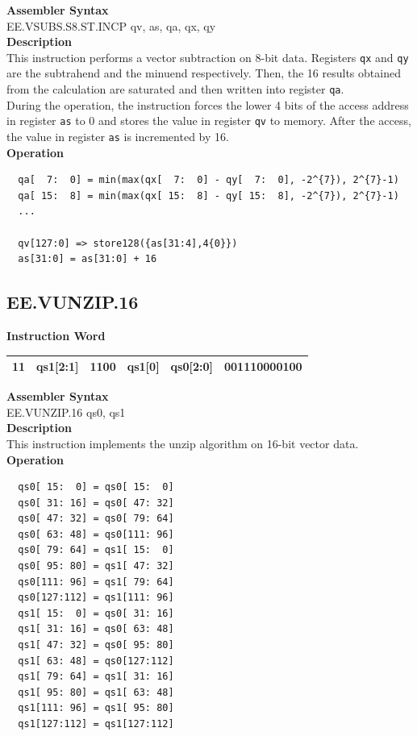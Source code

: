 \textbf{Assembler Syntax} \\
EE.VSUBS.S8.ST.INCP qv, as, qa, qx, qy \\
\textbf{Description} \\
This instruction performs a vector subtraction on 8-bit data. Registers \lstinline{qx} and \lstinline{qy} are the subtrahend and the minuend respectively. Then, the 16 results obtained from the calculation are saturated and then written into register \lstinline{qa}. \\ During the operation, the instruction forces the lower 4 bits of the access address in register \lstinline{as} to 0 and stores the value in register \lstinline{qv} to memory. After the access, the value in register \lstinline{as} is incremented by 16.\\
\textbf{Operation}
\begin{lstlisting}
  qa[  7:  0] = min(max(qx[  7:  0] - qy[  7:  0], -2^{7}), 2^{7}-1)
  qa[ 15:  8] = min(max(qx[ 15:  8] - qy[ 15:  8], -2^{7}), 2^{7}-1)
  ...

  qv[127:0] => store128({as[31:4],4{0}})
  as[31:0] = as[31:0] + 16
\end{lstlisting}

\clearpage
\subsection{EE.VUNZIP.16}\label{instruction:EEVUNZIP16}
\setlength\tabcolsep{6pt}
\textbf{Instruction Word} \\
\begin{tabular}{|c|c|c|c|c|c|}
	\hline
	11 & qs1[2:1] & 1100 & qs1[0] & qs0[2:0] & 001110000100 \\
	\hline
\end{tabular}

\textbf{Assembler Syntax} \\
EE.VUNZIP.16 qs0, qs1 \\
\textbf{Description} \\
This instruction implements the unzip algorithm on 16-bit vector data.\\
\textbf{Operation}
\begin{lstlisting}
  qs0[ 15:  0] = qs0[ 15:  0]
  qs0[ 31: 16] = qs0[ 47: 32]
  qs0[ 47: 32] = qs0[ 79: 64]
  qs0[ 63: 48] = qs0[111: 96]
  qs0[ 79: 64] = qs1[ 15:  0]
  qs0[ 95: 80] = qs1[ 47: 32]
  qs0[111: 96] = qs1[ 79: 64]
  qs0[127:112] = qs1[111: 96]
  qs1[ 15:  0] = qs0[ 31: 16]
  qs1[ 31: 16] = qs0[ 63: 48]
  qs1[ 47: 32] = qs0[ 95: 80]
  qs1[ 63: 48] = qs0[127:112]
  qs1[ 79: 64] = qs1[ 31: 16]
  qs1[ 95: 80] = qs1[ 63: 48]
  qs1[111: 96] = qs1[ 95: 80]
  qs1[127:112] = qs1[127:112]
\end{lstlisting}

